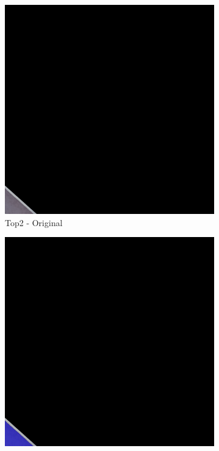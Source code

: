 \begin{figure}[H]
\begin{subfigure}{0.32\textwidth}
    \includegraphics[width=\textwidth]{02-main//figures/ch4/kfold_ensembles/segformer_tu-regnety_080.ra3_in1k/best_cases/best_4_iou0.989_24941121_tile_16_8_fd3555_original.png}
    \caption{Top2 - Original}
\end{subfigure}
\hfill
\begin{subfigure}{0.32\textwidth}
    \includegraphics[width=\textwidth]{02-main//figures/ch4/kfold_ensembles/segformer_tu-regnety_080.ra3_in1k/best_cases/best_4_iou0.989_24941121_tile_16_8_fd3555_overlay_gt.png}

\end{subfigure}
\end{figure}
